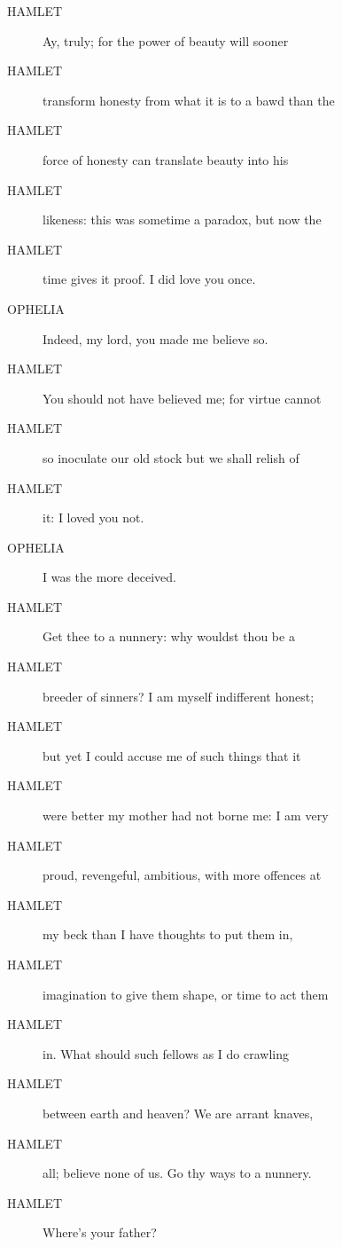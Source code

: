 \documentclass{article}
\begin{document}
\begin{description}
            
\item[HAMLET] Ay, truly; for the power of beauty will sooner
\item[HAMLET] transform honesty from what it is to a bawd than the
\item[HAMLET] force of honesty can translate beauty into his
\item[HAMLET] likeness: this was sometime a paradox, but now the
\item[HAMLET] time gives it proof. I did love you once.
\end{description}
          
\begin{description}
            
\item[OPHELIA] Indeed, my lord, you made me believe so.
\end{description}
          
\begin{description}
            
\item[HAMLET] You should not have believed me; for virtue cannot
\item[HAMLET] so inoculate our old stock but we shall relish of
\item[HAMLET] it: I loved you not.
\end{description}
          
\begin{description}
            
\item[OPHELIA] I was the more deceived.
\end{description}
          
\begin{description}
            
\item[HAMLET] Get thee to a nunnery: why wouldst thou be a
\item[HAMLET] breeder of sinners? I am myself indifferent honest;
\item[HAMLET] but yet I could accuse me of such things that it
\item[HAMLET] were better my mother had not borne me: I am very
\item[HAMLET] proud, revengeful, ambitious, with more offences at
\item[HAMLET] my beck than I have thoughts to put them in,
\item[HAMLET] imagination to give them shape, or time to act them
\item[HAMLET] in. What should such fellows as I do crawling
\item[HAMLET] between earth and heaven? We are arrant knaves,
\item[HAMLET] all; believe none of us. Go thy ways to a nunnery.
\item[HAMLET] Where's your father?
\end{description}
          
\end{document}
